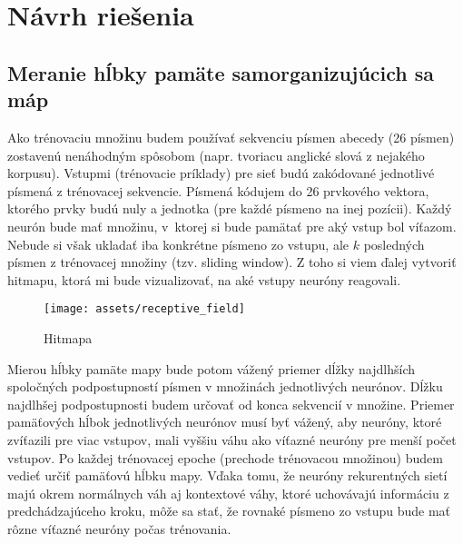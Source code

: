\chapter{Návrh riešenia}
\section{Meranie hĺbky pamäte samorganizujúcich sa máp}
Ako trénovaciu množinu budem používať sekvenciu písmen abecedy (26 písmen) zostavenú nenáhodným spôsobom (napr. tvoriacu anglické slová z nejakého korpusu).
Vstupmi (trénovacie príklady) pre sieť budú zakódované jednotlivé písmená z trénovacej sekvencie.
Písmená kódujem do 26 prvkového vektora, ktorého prvky budú nuly a jednotka (pre každé písmeno na inej pozícii).
Každý neurón bude mať množinu, v~ktorej si bude pamätať pre aký vstup bol víťazom. Nebude si však ukladať iba konkrétne písmeno zo vstupu, ale $k$ posledných písmen z trénovacej množiny (tzv. sliding window). 
Z toho si viem ďalej vytvoriť hitmapu, ktorá mi bude vizualizovať, na aké vstupy neuróny reagovali.

\begin{figure}[H]
	\centering
	\texttt{[image: assets/receptive\_field]}
	\caption{Hitmapa}
\end{figure}


Mierou hĺbky pamäte mapy bude potom vážený priemer dĺžky najdlhších spoločných podpostupností písmen v množinách jednotlivých neurónov. Dĺžku najdlhšej podpostupnosti budem určovať od konca sekvencií v množine. Priemer pamäťových hĺbok jednotlivých neurónov musí byť vážený, aby neuróny, %
ktoré zvíťazili pre viac vstupov, mali vyššiu váhu ako víťazné neuróny pre menší počet vstupov.
Po každej trénovacej epoche (prechode trénovacou množinou) budem vedieť určiť pamäťovú hĺbku mapy.
Vďaka tomu, že neuróny rekurentných sietí majú okrem normálnych váh aj kontextové váhy, ktoré uchovávajú informáciu z predchádzajúceho kroku,  môže sa stať, že rovnaké písmeno zo vstupu bude mať rôzne víťazné neuróny počas trénovania.


